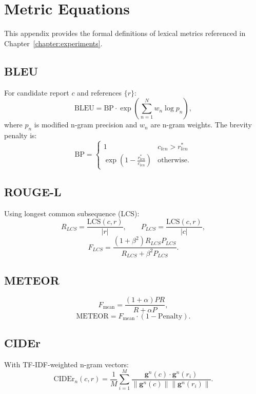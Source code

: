 \chapter{Metric Equations}\label{appendix:metric_equations}

This appendix provides the formal definitions of lexical metrics referenced in Chapter~\ref{chapter:experiments}.

\section{BLEU}
For candidate report $c$ and references $\{r\}$:
\begin{equation}
\mathrm{BLEU} = \mathrm{BP}\cdot \exp\!\left(\sum_{n=1}^{N} w_n \log p_n\right),
\end{equation}
where $p_n$ is modified n-gram precision and $w_n$ are n-gram weights. The brevity penalty is:
\begin{equation}
\mathrm{BP}=\begin{cases}
1 & c_{len} > r_{len}^* \\
\exp\left(1-\frac{r_{len}^*}{c_{len}}\right) & \text{otherwise.}
\end{cases}
\end{equation}

\section{ROUGE-L}
Using longest common subsequence (LCS):
\[
R_{LCS}=\frac{\mathrm{LCS}(c,r)}{|r|},\qquad
P_{LCS}=\frac{\mathrm{LCS}(c,r)}{|c|},
\]
\begin{equation}
F_{LCS}=\frac{(1+\beta^2)R_{LCS}P_{LCS}}{R_{LCS}+\beta^2P_{LCS}}.
\end{equation}

\section{METEOR}
\begin{equation}
F_{\mathrm{mean}}=\frac{(1+\alpha)PR}{R+\alpha P},
\end{equation}
\begin{equation}
\mathrm{METEOR}=F_{\mathrm{mean}}\cdot (1-\mathrm{Penalty}).
\end{equation}

\section{CIDEr}
With TF-IDF-weighted n-gram vectors:
\begin{equation}
\mathrm{CIDEr}_n(c,r)=\frac{1}{M}\sum_{i=1}^{M}
\frac{\mathbf{g}^n(c)\cdot\mathbf{g}^n(r_i)}{\|\mathbf{g}^n(c)\|\|\mathbf{g}^n(r_i)\|}.
\end{equation}
